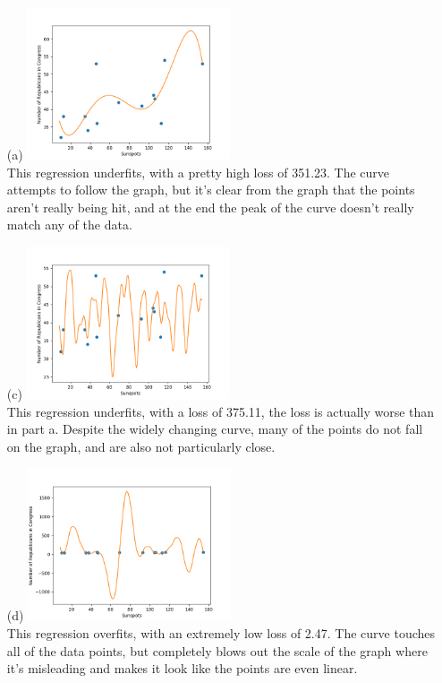 \documentclass[submit]{harvardml}
\begin{document}
\begin{itemize}
\item[(a)]
    \includegraphics[width=6cm]{part_a_sunspots.png} \\
    This regression underfits, with a pretty high loss of 351.23. The curve
    attempts to follow the graph, but it's clear from the graph that the points
    aren't really being hit, and at the end the peak of the curve doesn't
    really match any of the data.
\item[(c)]
    \includegraphics[width=6cm]{part_c_sunspots.png} \\
    This regression underfits, with a loss of 375.11, the loss is actually
    worse than in part a. Despite the widely changing curve, many of the points
    do not fall on the graph, and are also not particularly close.
\item[(d)]
    \includegraphics[width=6cm]{part_d_sunspots.png} \\
    This regression overfits, with an extremely low loss of 2.47. The curve
    touches all of the data points, but completely blows out the scale of the
    graph where it's misleading and makes it look like the points are even
    linear.
\end{itemize}
\end{document}
